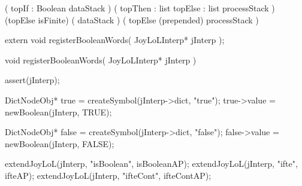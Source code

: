 \preDataStack
  (
    topIf : Boolean
    dataStack
  )
\preProcessStack
  (
    topThen : list
    topElse : list
    processStack
  )
\preConditions
  (topElse isFinite)
\postDataStack
  (
    dataStack
  )
\postProcessStack
  (
    topElse (prepended)
    processStack
  )
\postConditions
\stopRule

\stopJoyLoLWord

\startCHeader
extern void registerBooleanWords(
  JoyLoLInterp* jInterp
);
\stopCHeader
{}

\startCCode
void registerBooleanWords(
  JoyLoLInterp* jInterp
) {
  assert(jInterp);

  DictNodeObj* true  = createSymbol(jInterp->dict, "true");
  true->value    = newBoolean(jInterp, TRUE);

  DictNodeObj* false = createSymbol(jInterp->dict, "false");
  false->value   = newBoolean(jInterp, FALSE);

  extendJoyLoL(jInterp, "isBoolean", isBooleanAP);
  extendJoyLoL(jInterp, "ifte",      ifteAP);
  extendJoyLoL(jInterp, "ifteCont",  ifteContAP);
}
\stopCCode
